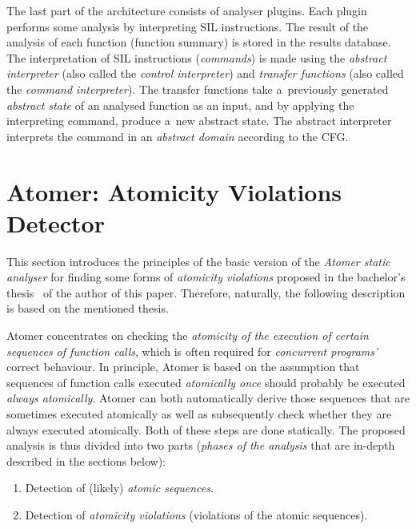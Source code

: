 \documentclass{ExcelAtFIT}
\theoremstyle{definition}
\begin{document}
The last part of the architecture consists of analyser plugins. Each plugin performs some analysis by interpreting SIL instructions. The result of the analysis of each function (function summary) is stored in the results database. The interpretation of SIL instructions (\emph{commands}) is made using the \emph{abstract interpreter} (also called the \emph{control interpreter}) and \emph{transfer functions} (also called the \emph{command interpreter}). The transfer functions take a~previously generated \emph{abstract state} of an analysed function as an input, and by applying the interpreting command, produce a~new abstract state. The abstract interpreter interprets the command in an \emph{abstract domain} according to the CFG.


\section{\hspace{-.15em}Atomer: Atomicity Violations Detector}
\label{sec:atomer}

This section introduces the principles of the basic version of the \emph{Atomer static analyser} for finding some forms of \emph{atomicity violations} proposed in the bachelor's thesis~\cite{harmimBP} of the author of this paper. Therefore, naturally, the following description is based on the mentioned thesis.

Atomer concentrates on checking the \emph{atomicity of the execution of certain sequences of function calls}, which is often required for \emph{concurrent programs'} correct behaviour. In principle, Atomer is based on the assumption that sequences of function calls executed \emph{atomically once} should probably be executed \emph{always atomically}. Atomer can both automatically derive those sequences that are sometimes executed atomically as well as subsequently check whether they are always executed atomically. Both of these steps are done statically. The proposed analysis is thus divided into two parts (\emph{phases of the analysis} that are in-depth described in the sections below):
\begin{enumerate}[label={\textbf{Phase~\arabic*}:}, leftmargin=4.2em]
    \item Detection of (likely) \emph{atomic sequences}.

    \item Detection of \emph{atomicity violations} (violations of the atomic sequences).
\end{enumerate}
\end{document}
